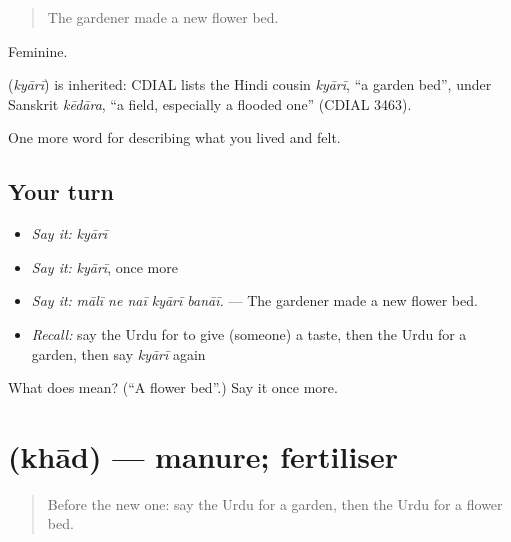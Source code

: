 \begin{quote}
The gardener made a new flower bed.
\end{quote}

Feminine.

\begin{cousinweb}
\textbf{} (\emph{kyārī}) is inherited: CDIAL lists the Hindi cousin \emph{kyārī}, \textquotedblleft{}a garden bed\textquotedblright{}, under Sanskrit \emph{kēdāra}, \textquotedblleft{}a field, especially a flooded one\textquotedblright{} (CDIAL 3463).
\end{cousinweb}

\begin{grammarlens}[title={What you've built}]
One more word for describing what you lived and felt.
\end{grammarlens}

\subsection*{Your turn}
\begin{itemize}
\raggedright
  \item \emph{Say it:} \emph{kyārī}
  \item \emph{Say it:} \emph{kyārī}, once more
  \item \emph{Say it:} \emph{mālī ne naī kyārī banāī.} — The gardener made a new flower bed.
  \item \emph{Recall:} say the Urdu for to give (someone) a taste, then the Urdu for a garden, then say \emph{kyārī} again
\end{itemize}

\begin{tcolorbox}[breakable,colback=teal!4,colframe=teal!35!black,title={Before you move on}]
What does  mean? (\textquotedblleft{}A flower bed\textquotedblright{}.) Say it once more.
\end{tcolorbox}
\section[\texorpdfstring{\ur{کھاد} (khād)}{کھاد (khād)}]{ (khād) — manure; fertiliser}

\label{lesson:UR-C512-khad}



\begin{quote}
Before the new one: say the Urdu for a garden, then the Urdu for a flower bed.
\end{quote}

